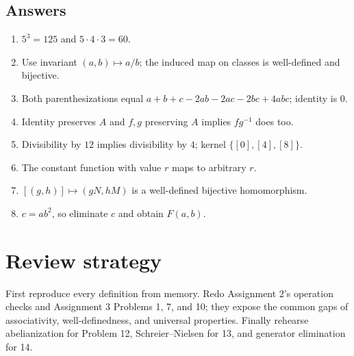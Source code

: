 \documentclass[11pt,openany]{book}
\theoremstyle{definition}
\begin{document}
\section*{Answers}
\begin{enumerate}
\item $5^3=125$ and $5\cdot4\cdot3=60$.
\item Use invariant $(a,b)\mapsto a/b$; the induced map on classes is well-defined and bijective.
\item Both parenthesizations equal $a+b+c-2ab-2ac-2bc+4abc$; identity is $0$.
\item Identity preserves $A$ and $f,g$ preserving $A$ implies $fg^{-1}$ does too.
\item Divisibility by $12$ implies divisibility by $4$; kernel $\{[0],[4],[8]\}$.
\item The constant function with value $r$ maps to arbitrary $r$.
\item $[(g,h)]\mapsto(gN,hM)$ is a well-defined bijective homomorphism.
\item $c=ab^2$, so eliminate $c$ and obtain $F(a,b)$.
\end{enumerate}


\chapter*{Review strategy}
First reproduce every definition from memory. Redo Assignment 2's operation checks and Assignment 3 Problems 1, 7, and 10; they expose the common gaps of associativity, well-definedness, and universal properties. Finally rehearse abelianization for Problem 12, Schreier--Nielsen for 13, and generator elimination for 14.
\end{document}
